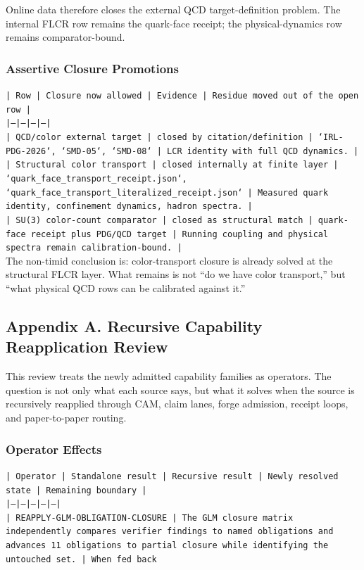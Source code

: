\documentclass[11pt]{article}
\begin{document}
Online data therefore closes the external QCD target-definition problem. The internal FLCR row remains the quark-face receipt; the physical-dynamics row remains comparator-bound.

\subsubsection*{Assertive Closure Promotions}

\noindent\texttt{| Row | Closure now allowed | Evidence | Residue moved out of the open row |}\\
\noindent\texttt{|---|---|---|---|}\\
\noindent\texttt{| QCD/color external target | closed by citation/definition | `IRL-PDG-2026`, `SMD-05`, `SMD-08` | LCR identity with full QCD dynamics. |}\\
\noindent\texttt{| Structural color transport | closed internally at finite layer | `quark\_face\_transport\_receipt.json`, `quark\_face\_transport\_literalized\_receipt.json` | Measured quark identity, confinement dynamics, hadron spectra. |}\\
\noindent\texttt{| SU(3) color-count comparator | closed as structural match | quark-face receipt plus PDG/QCD target | Running coupling and physical spectra remain calibration-bound. |}\\

The non-timid conclusion is: color-transport closure is already solved at the structural FLCR layer. What remains is not “do we have color transport,” but “what physical QCD rows can be calibrated against it.”

\subsection*{Appendix A. Recursive Capability Reapplication Review}

This review treats the newly admitted capability families as operators. The question is not only what each source says, but what it solves when the source is recursively reapplied through CAM, claim lanes, forge admission, receipt loops, and paper-to-paper routing.

\subsubsection*{Operator Effects}

\noindent\texttt{| Operator | Standalone result | Recursive result | Newly resolved state | Remaining boundary |}\\
\noindent\texttt{|---|---|---|---|---|}\\
\noindent\texttt{| REAPPLY-GLM-OBLIGATION-CLOSURE | The GLM closure matrix independently compares verifier findings to named obligations and advances 11 obligations to partial closure while identifying the untouched set. | When fed back }\\
\end{document}
